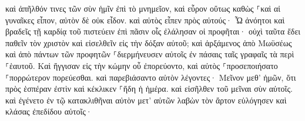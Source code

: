 \documentclass{openreader}
\begin{document}
καὶ ἀπῆλθόν τινες τῶν σὺν ἡμῖν ἐπὶ τὸ μνημεῖον, καὶ εὗρον οὕτως καθὼς ⸀καὶ αἱ γυναῖκες εἶπον, αὐτὸν δὲ οὐκ εἶδον. 
καὶ αὐτὸς εἶπεν πρὸς αὐτούς· Ὦ ἀνόητοι καὶ βραδεῖς τῇ καρδίᾳ τοῦ πιστεύειν ἐπὶ πᾶσιν οἷς ἐλάλησαν οἱ προφῆται· 
οὐχὶ ταῦτα ἔδει παθεῖν τὸν χριστὸν καὶ εἰσελθεῖν εἰς τὴν δόξαν αὐτοῦ; 
καὶ ἀρξάμενος ἀπὸ Μωϋσέως καὶ ἀπὸ πάντων τῶν προφητῶν ⸀διερμήνευσεν αὐτοῖς ἐν πάσαις ταῖς γραφαῖς τὰ περὶ ⸀ἑαυτοῦ. 
Καὶ ἤγγισαν εἰς τὴν κώμην οὗ ἐπορεύοντο, καὶ αὐτὸς ⸀προσεποιήσατο ⸀πορρώτερον πορεύεσθαι. 
καὶ παρεβιάσαντο αὐτὸν λέγοντες· Μεῖνον μεθ’ ἡμῶν, ὅτι πρὸς ἑσπέραν ἐστὶν καὶ κέκλικεν ⸀ἤδη ἡ ἡμέρα. καὶ εἰσῆλθεν τοῦ μεῖναι σὺν αὐτοῖς. 
καὶ ἐγένετο ἐν τῷ κατακλιθῆναι αὐτὸν μετ’ αὐτῶν λαβὼν τὸν ἄρτον εὐλόγησεν καὶ κλάσας ἐπεδίδου αὐτοῖς· 
\end{document}
